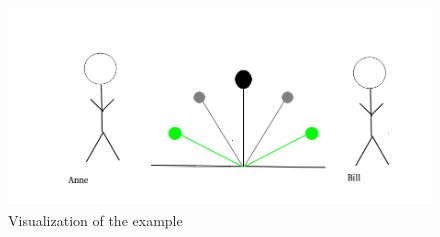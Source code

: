 \begin{figure}[h!]
  \begin{centering}
  \includegraphics[scale=0.5]{figures/pictures/Hebelbild.png}
  \caption{Visualization of the example}
  \label{leverexample}
  \end{centering}
\end{figure}
